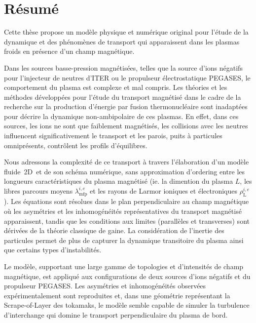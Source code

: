 \thispagestyle{empty}
\cleardoublepage
\thispagestyle{preface}	
\section*{Résumé}
		Cette thèse propose un modèle physique et numérique original pour l'étude de
		la dynamique et des phénomènes de transport qui apparaissent dans les plasmas
		froids en présence d'un champ magnétique. 
		
		Dans les sources basse-pression magnétisées, telles que la source d'ions
		négatifs pour l'injecteur de neutres d'ITER ou le propulseur électrostatique
		PEGASES, le comportement du plasma est complexe et mal compris.
		Les théories et les méthodes développées pour l'étude du transport magnétisé dans le cadre de la recherche
		sur la production d'énergie par fusion thermonucléaire sont inadaptées
		pour décrire la dynamique non-ambipolaire de ces plasmas. En effet, dans ces
		sources, les ions ne sont que faiblement magnétisés, les collisions avec les
		neutres influencent significativement le transport et les
		parois, puits à particules omniprésents, contrôlent les profils d'équilibres.
		
		Nous adressons la complexité de ce transport à travers l’élaboration d'un
		modèle fluide~2D\textonehalf ~et de son schéma numérique, sans approximation
		d'ordering entre les longueurs caractéristiques du plasma magnétisé (ie. la
		dimention du plasma $L$, les libres parcours moyens $\lambda_\text{mfp}^{i,e}$
		et les rayons de Larmor ioniques et électroniques 
		$\rho_\text{L}^{i,e}$).
		Les équations sont résolues dans le plan perpendiculaire au champ magnétique
		où les asymétries et les inhomogénéités représentatives du transport magnétisé
		apparaissent, tandis que les conditions aux limites (parallèles et
		transverses) sont dérivées de la théorie classique de gaine. La considération
		de l'inertie des particules permet de plus de capturer la dynamique
		transitoire du plasma ainsi que certains types d'instabilités.
		
		Le modèle, supportant une large gamme de topologies et d'intensités de champ
		magnétique, est appliqué aux configurations de deux sources d'ions négatifs et
		du propulseur PEGASES. Les asymétries et inhomogénéités observées
		expérimentalement sont reproduites et, dans une géométrie représentant la
		Scrape-of-Layer des tokamaks, le modèle semble capable de simuler
		la turbulence d'interchange qui domine le transport perpendiculaire du
		plasma de bord.
		\newpage
		\thispagestyle{empty}
		\cleardoublepage
		\thispagestyle{preface}	
